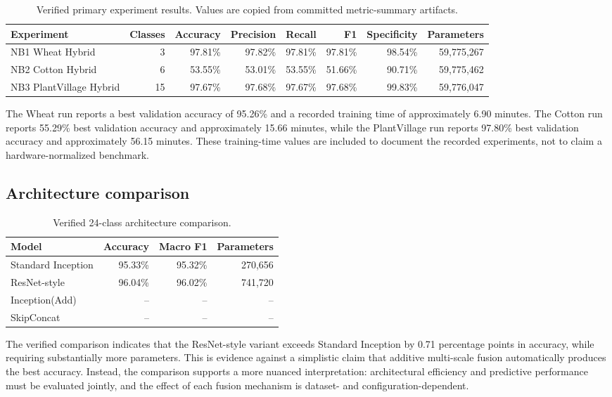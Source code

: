 \documentclass[a4paper,fleqn]{cas-dc}
\begin{document}
\begin{table}[t]
\centering
\caption{Verified primary experiment results. Values are copied from committed metric-summary artifacts.}
\label{tab:primary}
\small
\begin{tabular}{@{}lrrrrrrr@{}}
\toprule
Experiment & Classes & Accuracy & Precision & Recall & F1 & Specificity & Parameters \\
\midrule
NB1 Wheat Hybrid & 3 & 97.81\% & 97.82\% & 97.81\% & 97.81\% & 98.54\% & 59,775,267 \\
NB2 Cotton Hybrid & 6 & 53.55\% & 53.01\% & 53.55\% & 51.66\% & 90.71\% & 59,775,462 \\
NB3 PlantVillage Hybrid & 15 & 97.67\% & 97.68\% & 97.67\% & 97.68\% & 99.83\% & 59,776,047 \\
\bottomrule
\end{tabular}
\end{table}

The Wheat run reports a best validation accuracy of 95.26\% and a recorded training time of approximately 6.90 minutes. The Cotton run reports 55.29\% best validation accuracy and approximately 15.66 minutes, while the PlantVillage run reports 97.80\% best validation accuracy and approximately 56.15 minutes. These training-time values are included to document the recorded experiments, not to claim a hardware-normalized benchmark.

\subsection{Architecture comparison}
\begin{table}[t]
\centering
\caption{Verified 24-class architecture comparison.}
\label{tab:architecture-results}
\small
\begin{tabular}{@{}lrrr@{}}
\toprule
Model & Accuracy & Macro F1 & Parameters \\
\midrule
Standard Inception & 95.33\% & 95.32\% & 270,656 \\
ResNet-style & 96.04\% & 96.02\% & 741,720 \\
Inception(Add) & -- & -- & -- \\
SkipConcat & -- & -- & -- \\
\bottomrule
\end{tabular}
\end{table}

The verified comparison indicates that the ResNet-style variant exceeds Standard Inception by 0.71 percentage points in accuracy, while requiring substantially more parameters. This is evidence against a simplistic claim that additive multi-scale fusion automatically produces the best accuracy. Instead, the comparison supports a more nuanced interpretation: architectural efficiency and predictive performance must be evaluated jointly, and the effect of each fusion mechanism is dataset- and configuration-dependent.
\end{document}
